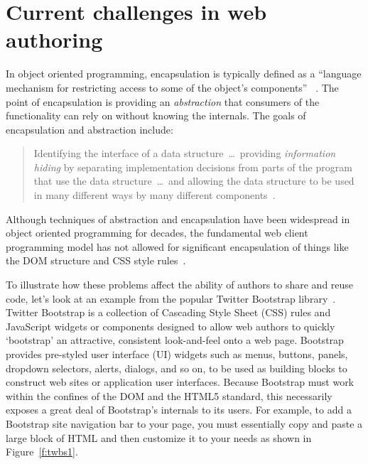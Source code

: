 \section{Current challenges in web authoring}
In object oriented programming, encapsulation is typically defined as a 
``language mechanism for restricting access to some of the object's components''
~\cite[p. 522]{mitchell2003}.
The point of encapsulation is providing an \textit{abstraction} that consumers of the functionality can rely on without knowing the internals. 
The goals of encapsulation and abstraction include:
\begin{quote}
Identifying the interface of a data structure~\dots~providing \textit{information hiding} by separating implementation decisions from parts of the program that use the data 
structure~\dots~and allowing the data structure to be used in many different ways by many different components~\cite[p. 243]{mitchell2003}.
\end{quote}

Although techniques of abstraction and encapsulation have been widespread in object oriented programming for decades,
the fundamental web client programming model has not allowed for significant encapsulation of things like the DOM structure and CSS style rules~\cite{ihrig2012}.

To illustrate how these problems affect the ability of authors to share and reuse code, let's look at an example from the popular Twitter Bootstrap library~\cite{bootstrapcontributors2015}.
Twitter Bootstrap is a collection of Cascading Style Sheet (CSS) rules and JavaScript widgets or components designed to allow web authors to quickly `bootstrap' an attractive, consistent look-and-feel onto a web page.
Bootstrap provides pre-styled user interface (UI) widgets such as menus, buttons, panels, dropdown selectors, alerts, dialogs, and so on, to be used as building blocks to construct web sites or application user interfaces.
Because Bootstrap must work within the confines of the DOM and the HTML5 standard, this necessarily exposes a great deal of Bootstrap's internals to its users.
For example, to add a Bootstrap site navigation bar to your page, you must essentially copy and paste a large block of HTML and then customize it to your needs as shown in Figure~\ref{f:twbs1}.

